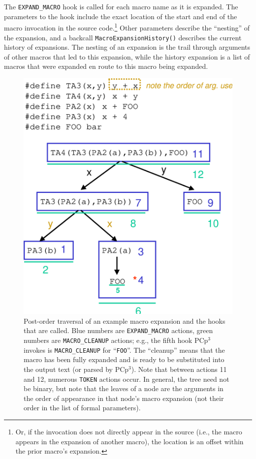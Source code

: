 \documentclass{article}
\newcommand{\pcp}{\mbox{\textsf{PCp}$^3$}}
\newcommand{\ie}{i.e.,}
\newcommand{\eg}{e.g.,}
\begin{document}
\noindent The \texttt{EXPAND\_MACRO} hook is called for each macro name as it is
expanded.  The parameters to the hook include the exact location of the
start and end of the macro invocation in the source code.\footnote{Or,
  if the invocation does not directly appear in the source (\ie{} the
  macro appears in the expansion of another macro), the location is an
  offset within the prior macro's expansion.}  Other parameters
describe the ``nesting'' of the expansion, and a backcall
\texttt{Macro\-Expansion\-History()} describes the current history of
expansions.  The nesting of an expansion is the trail through arguments
of other macros that led to this expansion, while the history expansion
is a list of macros that were expanded en route to this macro being
expanded.

\begin{figure}[p]
  \begin{center}
    \leavevmode
    \includegraphics[width=0.45\linewidth]{figs/tree-expn.eps}
    \caption{Post-order traversal of an example macro expansion and the
      hooks that are called. Blue numbers are \texttt{EXPAND\_MACRO}
      actions, green numbers are \texttt{MACRO\_CLEANUP} actions; \eg{}
      the fifth hook \pcp{} invokes is \texttt{MACRO\_CLEANUP} for
      ``\texttt{FOO}''.  The ``cleanup'' means that the macro has been
      fully expanded and is ready to be substituted into the output text
      (or parsed by \pcp{}). Note that between actions 11 and 12, numerous
      \texttt{TOKEN} actions occur.  In general, the tree need not be
      binary, but note that the leaves of a node are the arguments in
      the order of appearance in that node's macro expansion (not their
      order in the list of formal parameters).}
    \label{fig:tree-expn}
  \end{center}
\end{figure}
\end{document}
